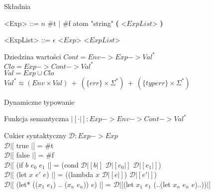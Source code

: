 \documentclass[12pt,serif]{beamer}
\begin{document}
\begin{frame}{Składnia}
\setlength{\grammarindent}{8em}
\begin{grammar}
<Exp> ::= $n$
\alt \#t | \#f
\alt atom
\alt "string"
\alt \textbf{(} <$ExpList$> \textbf{)}

<ExpList> ::= $\epsilon$
\alt <$Exp$> <$ExpList$>
\end{grammar}
\end{frame}

\begin{frame}{Dziedzina wartości}
$Cont = Env -> Exp -> Val^{*}$ \\
$Clo = Exp -> Cont -> Val^{*}$ \\
$Val = Exp \cup Clo$ \\
$Val^{*} \approx (Env \times Val)~+~(\{err\} \times \Sigma^{*})~+~(\{typerr\} \times \Sigma^{*})$\\
\end{frame}

\begin{frame}{Dynamiczne typowanie}

\end{frame}

\begin{frame}{Funkcja semantyczna}
$|[ \cdot |]: Exp -> Env -> Cont -> Val^{*}$
\end{frame}

\begin{frame}{Cukier syntaktyczny}
$\mathcal{D} : Exp -> Exp$ \newline
\\
$\mathcal{D}|[$ true $|]$ = \#t \\
$\mathcal{D}|[$ false $|]$ = \#f \newline
\\
$\mathcal{D}|[$ (if $b$ $e_0$ $e_1$ $|]$ =
   (cond $\mathcal{D}|[ b |]$ $\mathcal{D}|[ e_0 |]$ $\mathcal{D}|[ e_1 |]$) \newline
\\
$\mathcal{D}|[$ (let $x$ $e'$ $e$) $|]$ =
   ((lambda $x$ $\mathcal{D}|[e|]$) $\mathcal{D}|[e'|]$) \\
$\mathcal{D}|[$ (let* (($x_1$ $e_1$) .. ($x_n$ $e_n$)) $e$) $|]$ = 
   $\mathcal{D}|[$(let $x_1$ $e_1$ (..(let $x_n$ $e_n$ $e$)..))$|]$ \\
\end{frame}
\end{document}
